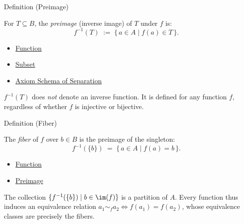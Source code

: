 \begin{definitionbox}{Definition (Preimage)}
\begin{definition}[Preimage]\label{def:preimage}
For $T \subseteq B$, the \emph{preimage} (inverse image) of $T$ under $f$ is:
\[
f^{-1}(T) \;:=\; \{\, a \in A \mid f(a) \in T \,\}.
\]
\end{definition}
\end{definitionbox}

\begin{dependencies}
\begin{itemize}
  \item \hyperref[def:function]{Function}
  \item \hyperref[def:subset]{Subset}
  \item \hyperref[ax:separation]{Axiom Schema of Separation}
\end{itemize}
\end{dependencies}

\begin{remark*}
$f^{-1}(T)$ does \emph{not} denote an inverse function. It is defined for any
function $f$, regardless of whether $f$ is injective or bijective.
\end{remark*}

\begin{definitionbox}{Definition (Fiber)}
\begin{definition}[Fiber]\label{def:fiber}
The \emph{fiber} of $f$ over $b \in B$ is the preimage of the singleton:
\[
f^{-1}(\{b\}) \;=\; \{\, a \in A \mid f(a) = b \,\}.
\]
\end{definition}
\end{definitionbox}

\begin{dependencies}
\begin{itemize}
  \item \hyperref[def:function]{Function}
  \item \hyperref[def:preimage]{Preimage}
\end{itemize}
\end{dependencies}

\begin{remark*}
The collection $\{f^{-1}(\{b\}) \mid b \in \im(f)\}$ is a partition of $A$.
Every function thus induces an equivalence relation $a_1 \sim_f a_2 \iff f(a_1) = f(a_2)$,
whose equivalence classes are precisely the fibers.
\end{remark*}

